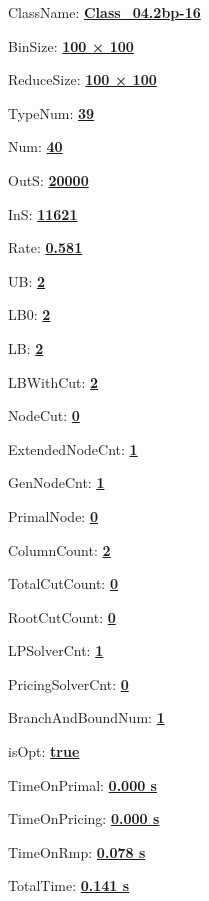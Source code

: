 \documentclass[11pt]{article}
\begin{document}
\pagestyle{empty}


ClassName: \underline{\textbf{Class_04.2bp-16}}
\par
BinSize: \underline{\textbf{100 × 100}}
\par
ReduceSize: \underline{\textbf{100 × 100}}
\par
TypeNum: \underline{\textbf{39}}
\par
Num: \underline{\textbf{40}}
\par
OutS: \underline{\textbf{20000}}
\par
InS: \underline{\textbf{11621}}
\par
Rate: \underline{\textbf{0.581}}
\par
UB: \underline{\textbf{2}}
\par
LB0: \underline{\textbf{2}}
\par
LB: \underline{\textbf{2}}
\par
LBWithCut: \underline{\textbf{2}}
\par
NodeCut: \underline{\textbf{0}}
\par
ExtendedNodeCnt: \underline{\textbf{1}}
\par
GenNodeCnt: \underline{\textbf{1}}
\par
PrimalNode: \underline{\textbf{0}}
\par
ColumnCount: \underline{\textbf{2}}
\par
TotalCutCount: \underline{\textbf{0}}
\par
RootCutCount: \underline{\textbf{0}}
\par
LPSolverCnt: \underline{\textbf{1}}
\par
PricingSolverCnt: \underline{\textbf{0}}
\par
BranchAndBoundNum: \underline{\textbf{1}}
\par
isOpt: \underline{\textbf{true}}
\par
TimeOnPrimal: \underline{\textbf{0.000 s}}
\par
TimeOnPricing: \underline{\textbf{0.000 s}}
\par
TimeOnRmp: \underline{\textbf{0.078 s}}
\par
TotalTime: \underline{\textbf{0.141 s}}
\par
\newpage
\end{document}

